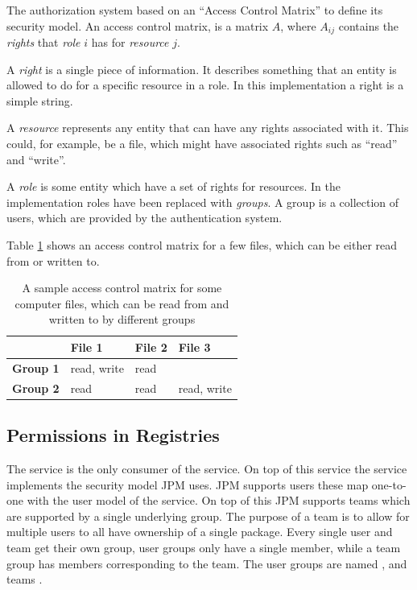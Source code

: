 
The authorization system based on an ``Access Control
Matrix''\cite{sandhu1994access} to define its security model. An access control
matrix, is a matrix $A$, where $A_{ij}$ contains the \emph{rights} that
\emph{role} $i$ has for \emph{resource} $j$.

A \emph{right} is a single piece of information. It describes something that an
entity is allowed to do for a specific resource in a role. In this
implementation a right is a simple string.

A \emph{resource} represents any entity that can have any rights associated
with it. This could, for example, be a file, which might have associated rights
such as ``read'' and ``write''.

A \emph{role} is some entity which have a set of rights for resources. In the
implementation roles have been replaced with \emph{groups}. A group is a
collection of users, which are provided by the authentication system.

Table \ref{tab:acm_example} shows an access control matrix for a few files,
which can be either read from or written to.

\begin{table}[H]
  \begin{center}
  \begin{tabular}{ | l | l | l | l | }
    \hline
            & \textbf{File 1}        & \textbf{File 2}      & \textbf{File 3}
    \\ \hline
    \textbf{Group 1} & read, write   & read                 &
    \\ \hline
    \textbf{Group 2} & read          & read                 & read, write
    \\ \hline
  \end{tabular}
  \end{center}

  \caption{A sample access control matrix for some computer files, which can be
      read from and written to by different groups}

  \label{tab:acm_example}
\end{table}

\subsection{Permissions in Registries}

The \registry service is the only consumer of the \security service. On top of
this service the \registry service implements the security model JPM uses. JPM
supports users these map one-to-one with the user model of the \security
service. On top of this JPM supports teams which are supported by a single
underlying group. The purpose of a team is to allow for multiple users to all
have ownership of a single package. Every single user and team get their own
group, user groups only have a single member, while a team group has members
corresponding to the team. The user groups are named , and
teams .

